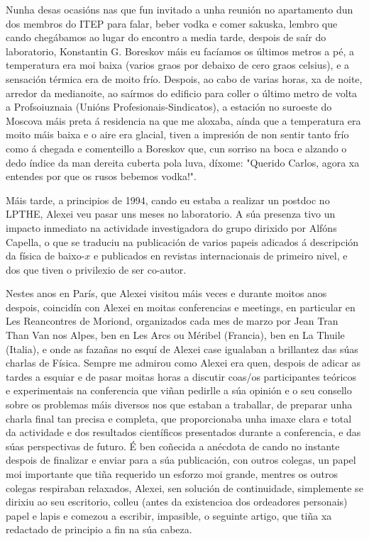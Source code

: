 \begin{refsection}
\begin{multicols}{2}
Nunha desas ocasións nas que fun invitado a unha reunión no apartamento dun dos membros do ITEP para falar, beber vodka e comer sakuska, lembro que cando chegábamos ao lugar do encontro a media tarde, despois de saír do laboratorio, Konstantin G. Boreskov máis eu facíamos os últimos metros a pé, a temperatura era moi baixa (varios graos por debaixo de cero graos celsius), e a sensación térmica era de moito frío. Despois, ao cabo de varias horas, xa de noite, arredor da medianoite, ao saírmos do edificio para coller o último metro de volta a Profsoiuznaia (Unións Profesionais-Sindicatos), a estación no suroeste do Moscova máis preta á residencia na que me aloxaba, aínda que a temperatura era moito máis baixa e o aire era glacial, tiven a impresión de non sentir tanto frío como á chegada e comenteillo a Boreskov que, cun sorriso na boca e alzando o dedo índice da man dereita cuberta pola luva, díxome: "Querido Carlos, agora xa entendes por que os rusos bebemos vodka!".

Máis tarde, a principios de 1994, cando eu estaba a realizar un postdoc no LPTHE, Alexei veu pasar uns meses no laboratorio. A súa presenza tivo un impacto inmediato na actividade investigadora do grupo dirixido por Alfóns Capella, o que se traduciu na publicación de varios papeis adicados á descripción da física de baixo-$x$ e publicados en revistas internacionais de primeiro nivel, e dos que tiven o privilexio de ser co-autor.

Nestes anos en París, que Alexei visitou máis veces e durante moitos anos despois, coincidín con Alexei en moitas conferencias e meetings, en particular en Les Reancontres de Moriond, organizados cada mes de marzo por Jean Tran Than Van nos Alpes, ben en Les Arcs ou Méribel (Francia), ben en La Thuile (Italia), e onde as fazañas no esquí de Alexei case igualaban a brillantez das súas charlas de Física. Sempre me admirou como Alexei era quen, despois de adicar as tardes a esquiar e de pasar moitas horas a discutir coas/os participantes teóricos e experimentais na conferencia que viñan pedirlle a súa opinión e o seu consello sobre os problemas máis diversos nos que estaban a traballar, de preparar unha charla final tan precisa e completa, que proporcionaba unha imaxe clara e total da actividade e dos resultados científicos presentados durante a conferencia, e das súas perspectivas de futuro. É ben coñecida a anécdota de cando no instante despois de finalizar e enviar para a súa publicación, con outros colegas, un papel moi importante que tiña requerido un esforzo moi grande, mentres os outros colegas respiraban relaxados, Alexei, sen solución de continuidade, simplemente se dirixiu ao seu escritorio, colleu (antes da existencioa dos ordeadores personais) papel e lapis e comezou a escribir, impasible, o seguinte artigo, que tiña xa redactado de principio a fin na súa cabeza.


\end{multicols}
\end{refsection}
